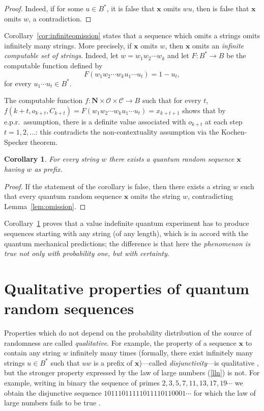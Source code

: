 \documentclass[%
 preprint,
 showpacs,
 showkeys,
 preprintnumbers,
  amsmath,amssymb,
  aps,
 pra,
  longbibliography,
  floatfix,
 ]{revtex4-1}
\theoremstyle{plain}
\newtheorem{corollary}[theorem]{Corollary}
\newcommand{\B}{B^*}%
\newcommand{\x}{\mathbf{x}}
\newcommand{\ar}{\rightarrow}
\begin{document}
\begin{proof}
Indeed, if for some $u \in B^{*}$, it is false that $\x$ omits $wu$, then is false that $\x$ omits $w$, a contradiction.
\end{proof}


Corollary~\ref{cor:infiniteomission} states that a sequence which omits a strings omits infinitely many strings. More precisely, if  $\x$ omits $w$, then $\x$ omits an {\em infinite computable set of strings}. Indeed, let  $w= w_{1}w_{2}\cdots w_{k}$ and let $F: B^{*} \ar B$ be the computable function defined by
\[F(w_{1}w_{2}\cdots w_{k}u_{1}\cdots u_{t}) = 1-u_{t},\]
for every $u_{1}\cdots u_{t} \in \B$.

The computable function $f : \mathbf{N}\times \mathcal{O}\times \mathcal{C} \to B$
such that for every $t$, $f(k+t,o_{k+t},C_{k+t})=F(w_{1}w_{2}\cdots w_{k}u_{1}\cdots u_{t}) = x_{k+t+1}$ shows that by e.p.r.\ assumption,
 there is a definite value associated with $o_{k+t}$ at each step $t=1,2,\dots$: this contradicts the non-contextuality assumption via the Kochen-Specker theorem.


\begin{corollary}
\label{cor:allprefixes}
For every string $w$ there exists a quantum random sequence $\x$ having $w$ as prefix.
\end{corollary}
\begin{proof}
If the statement of the corollary is false, then there exists a string $w$ such that every quantum random sequence $\x$ omits the string $w$,  contradicting Lemma~\ref{lem:omission}.
\end{proof}


Corollary~\ref{cor:allprefixes} proves  that  a value indefinite quantum experiment has to produce sequences starting with any  string (of any length), which is in accord with the quantum mechanical predictions; the difference is that here the {\em phenomenon is true not only with probability one, but with certainty}.





\section{Qualitative properties of quantum random sequences}

Properties which do not depend on the probability distribution of the source of randomness
are called {\em qualitative}. For example, the property of a sequence $\x$ to contain any string $w$  infinitely many times (formally, there exist infinitely many strings $u\in \B$ such
that $uw$ is a prefix of $\x$)---called {\em disjunctivity}---is qualitative \cite{}, but the stronger property expressed by the law of large numbers (\ref{lln})  is not. For example, writing in binary the sequence of primes $2, 3, 5, 7, 11, 13, 17, 19\cdots$ we obtain the disjunctive sequence $10111011111011110110001\cdots$ for which the law of large numbers fails to be true \cite{}.
\end{document}
